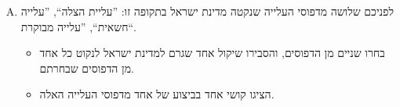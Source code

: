 \documentclass[]{../../../../tex/classes/styledArticle}
\begin{document}
	\begin{enumerate}[A.]
		\item לפניכם שלושה מדפוסי העלייה שנקטה מדינת ישראל בתקופה זו: ''עליית הצלה``, ''עלייה חשאית``, ''עלייה מבוקרת``. 
		\begin{itemize}
			\item בחרו שניים מן הדפוסים, והסבירו שיקול אחד שגרם למדינת ישראל לנקוט כל אחד מן הדפוסים שבחרתם. 
			\item הציגו קושי אחד בביצוע של אחד מדפוסי העלייה האלה. 
		\end{itemize}
	\end{enumerate}
	
	
\end{document}
